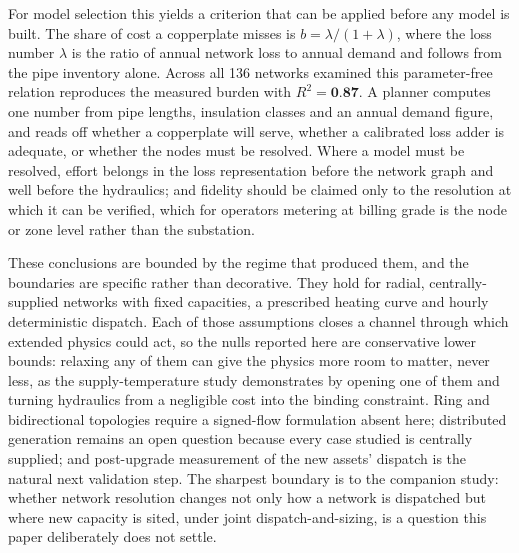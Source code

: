 For model selection this yields a criterion that can be applied before any model is built.
The share of cost a copperplate misses is $b = \lambda/(1+\lambda)$, where the loss number
$\lambda$ is the ratio of annual network loss to annual demand and follows from the pipe
inventory alone. Across all 136 networks examined this parameter-free relation reproduces
the measured burden with $R^2 = \textbf{0.87}$. A planner computes one number from pipe
lengths, insulation classes and an annual demand figure, and reads off whether a copperplate
will serve, whether a calibrated loss adder is adequate, or whether the nodes must be
resolved. Where a model must be resolved, effort belongs in the loss representation before
the network graph and well before the hydraulics; and fidelity should be claimed only to the
resolution at which it can be verified, which for operators metering at billing grade is the
node or zone level rather than the substation.

These conclusions are bounded by the regime that produced them, and the boundaries are
specific rather than decorative. They hold for radial, centrally-supplied networks with
fixed capacities, a prescribed heating curve and hourly deterministic dispatch. Each of
those assumptions closes a channel through which extended physics could act, so the nulls
reported here are conservative lower bounds: relaxing any of them can give the physics more
room to matter, never less, as the supply-temperature study demonstrates by opening one of
them and turning hydraulics from a negligible cost into the binding constraint. Ring and
bidirectional topologies require a signed-flow formulation absent here; distributed
generation remains an open question because every case studied is centrally supplied; and
post-upgrade measurement of the new assets' dispatch is the natural next validation step.
The sharpest boundary is to the companion study: whether network resolution changes not only
how a network is dispatched but where new capacity is sited, under joint
dispatch-and-sizing, is a question this paper deliberately does not settle.
